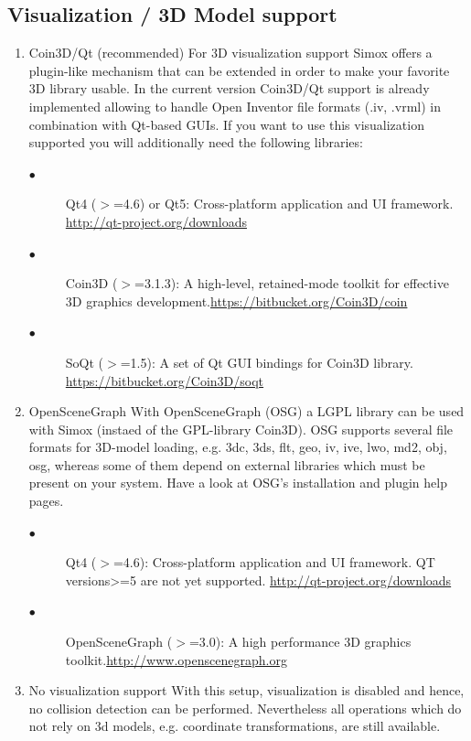 \subsection{Visualization / 3D Model support}
\setcounter{MyCounter}{1}%
\begin{enumerate}[label={\arabic{MyCounter}\addtocounter{MyCounter}{1}}]
\item Coin3D/Qt (recommended) For 3D visualization support Simox offers a plugin-like mechanism that can be extended in order to make your favorite 3D library usable. In the current version Coin3D/Qt support is already implemented allowing to handle Open Inventor file formats (.iv, .vrml) in combination with Qt-based GUIs. If you want to use this visualization supported you will additionally need the following libraries:
\begin{description}
\item[$\bullet$ ] Qt4 ($>$=4.6) or Qt5: Cross-platform application and UI framework.\newline 
\hyperref[qt]{http://qt-project.org/downloads} 
\item[$\bullet$ ] Coin3D ($>$=3.1.3): A high-level, retained-mode toolkit for effective 3D graphics development.\newline  \hyperref[coin3d]{https://bitbucket.org/Coin3D/coin} 
\item[$\bullet$ ] SoQt ($>$=1.5): A set of Qt GUI bindings for Coin3D library. \newline 
\hyperref[SoQt]{https://bitbucket.org/Coin3D/soqt} 
\end{description} 
\item OpenSceneGraph With OpenSceneGraph (OSG) a LGPL library can be used with Simox (instaed of the GPL-library Coin3D). OSG supports several file formats for 3D-model loading, e.g. 3dc, 3ds, flt, geo, iv, ive, lwo, md2, obj, osg, whereas some of them depend on external libraries which must be present on your system. Have a look at OSG's installation and plugin help pages. 
\begin{description}
\item[$\bullet$ ] Qt4 ($>$=4.6): Cross-platform application and UI framework. QT versions>=5 are not yet supported.\newline 
\hyperref[qt]{http://qt-project.org/downloads} 
\item[$\bullet$ ] OpenSceneGraph ($>$=3.0): A high performance 3D graphics toolkit.\newline  \hyperref[openscene]{http://www.openscenegraph.org} 
\end{description} 
\item No visualization support With this setup, visualization is disabled and hence, no collision detection can be performed. Nevertheless all operations which do not rely on 3d models, e.g. coordinate transformations, are still available. 
\end{enumerate}
